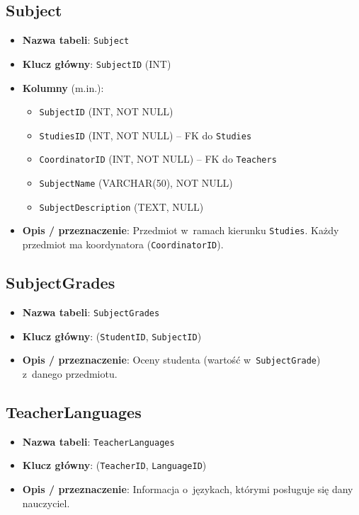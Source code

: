 \documentclass[12pt]{article}
\begin{document}
\subsection{Subject}
\begin{itemize}
    \item \textbf{Nazwa tabeli}: \texttt{Subject}
    \item \textbf{Klucz główny}: \texttt{SubjectID} (INT)
    \item \textbf{Kolumny} (m.in.):
          \begin{itemize}
            \item \texttt{SubjectID} (INT, NOT NULL)
            \item \texttt{StudiesID} (INT, NOT NULL) -- FK do \texttt{Studies}
            \item \texttt{CoordinatorID} (INT, NOT NULL) -- FK do \texttt{Teachers}
            \item \texttt{SubjectName} (VARCHAR(50), NOT NULL)
            \item \texttt{SubjectDescription} (TEXT, NULL)
          \end{itemize}
    \item \textbf{Opis / przeznaczenie}:  
          Przedmiot w~ramach kierunku \texttt{Studies}.  
          Każdy przedmiot ma koordynatora (\texttt{CoordinatorID}).
\end{itemize}

\subsection{SubjectGrades}
\begin{itemize}
    \item \textbf{Nazwa tabeli}: \texttt{SubjectGrades}
    \item \textbf{Klucz główny}: (\texttt{StudentID}, \texttt{SubjectID})
    \item \textbf{Opis / przeznaczenie}:  
          Oceny studenta (wartość w~\texttt{SubjectGrade}) z~danego przedmiotu.
\end{itemize}

\subsection{TeacherLanguages}
\begin{itemize}
    \item \textbf{Nazwa tabeli}: \texttt{TeacherLanguages}
    \item \textbf{Klucz główny}: (\texttt{TeacherID}, \texttt{LanguageID})
    \item \textbf{Opis / przeznaczenie}:  
          Informacja o~językach, którymi posługuje się dany nauczyciel.
\end{itemize}
\end{document}
